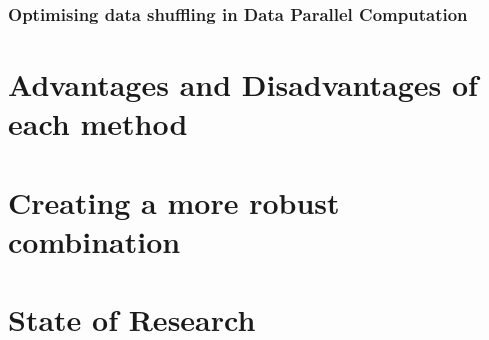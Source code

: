 \documentclass[]{article}
\begin{document}
\subsubsection{Optimising data shuffling in Data Parallel Computation}

\section{Advantages and Disadvantages of each method}
\subsection{}

\subsection{}

\subsection{}

\subsection{}

\subsection{}

\section{Creating a more robust combination}

\section{State of Research}
\end{document}
